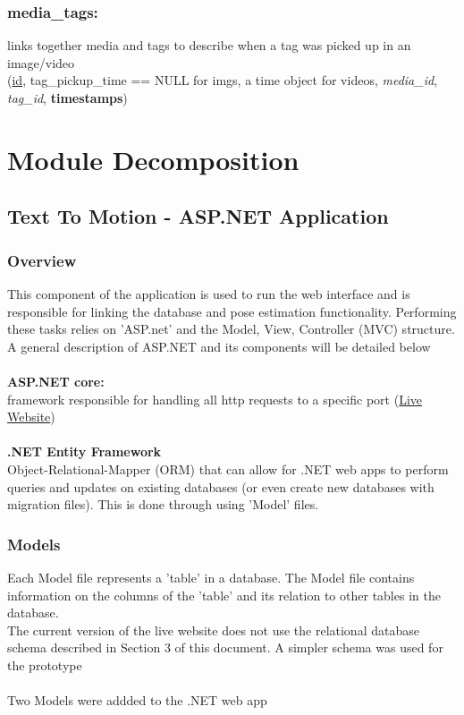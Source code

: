 \documentclass{scrreprt}
\begin{document}
\subsection{media\_tags:}

links together media and tags to describe when a tag was picked up in an image/video
\\
(\underline{id}, tag\_pickup\_time == NULL for imgs, a time object for videos, \textit{media\_id}, \textit{tag\_id}, \textbf{timestamps})

\chapter{Module Decomposition}

\section{Text To Motion - ASP.NET Application}


\subsection{Overview}
This component of the application is used to run the web interface and is responsible for linking the database and pose estimation functionality. Performing these tasks relies on 'ASP.net' and the Model, View, Controller (MVC) structure. A general description of ASP.NET and its components will be detailed below
\\\\
\textbf{ASP.NET core:}
\\
framework responsible for handling all http requests to a specific port (\href{159.203.10.112}{Live Website})
\\\\
\textbf{.NET Entity Framework}
\\Object-Relational-Mapper (ORM) that can allow for .NET web apps to perform queries and updates on existing databases (or even create new databases with migration files). This is done through using 'Model' files.

\subsection{Models}

Each Model file represents a 'table' in a database. The Model file contains information on the columns of the 'table' and its relation to other tables in the database.
\\
The current version of the live website does not use the relational database schema described in Section 3 of this document. A simpler schema was used for the prototype
\\\\
Two Models were addded to the .NET web app
\end{document}
